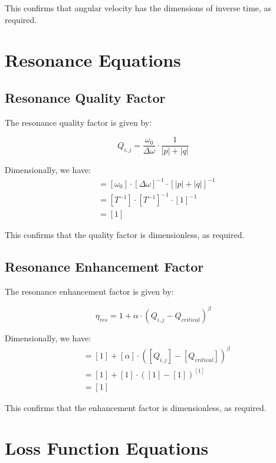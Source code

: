 This confirms that angular velocity has the dimensions of inverse time, as required.

\section{Resonance Equations}

\subsection{Resonance Quality Factor}

The resonance quality factor is given by:

\begin{equation}
Q_{i,j} = \frac{\omega_0}{\Delta \omega} \cdot \frac{1}{|p| + |q|}
\end{equation}

Dimensionally, we have:
\begin{align}
[Q_{i,j}] &= [\omega_0] \cdot [\Delta \omega]^{-1} \cdot [|p| + |q|]^{-1} \\
&= [T^{-1}] \cdot [T^{-1}]^{-1} \cdot [1]^{-1} \\
&= [1]
\end{align}

This confirms that the quality factor is dimensionless, as required.

\subsection{Resonance Enhancement Factor}

The resonance enhancement factor is given by:

\begin{equation}
\eta_{res} = 1 + \alpha \cdot (Q_{i,j} - Q_{critical})^{\beta}
\end{equation}

Dimensionally, we have:
\begin{align}
[\eta_{res}] &= [1] + [\alpha] \cdot ([Q_{i,j}] - [Q_{critical}])^{\beta} \\
&= [1] + [1] \cdot ([1] - [1])^{[1]} \\
&= [1]
\end{align}

This confirms that the enhancement factor is dimensionless, as required.

\section{Loss Function Equations}

